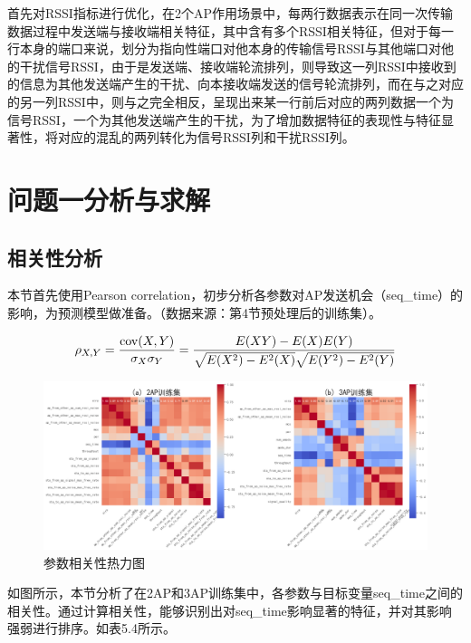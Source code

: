 \documentclass[bwprint]{gmcmthesis}
\begin{document}
首先对RSSI指标进行优化，在2个AP作用场景中，每两行数据表示在同一次传输数据过程中发送端与接收端相关特征，其中含有多个RSSI相关特征，但对于每一行本身的端口来说，划分为指向性端口对他本身的传输信号RSSI与其他端口对他的干扰信号RSSI，由于是发送端、接收端轮流排列，则导致这一列RSSI中接收到的信息为其他发送端产生的干扰、向本接收端发送的信号轮流排列，而在与之对应的另一列RSSI中，则与之完全相反，呈现出来某一行前后对应的两列数据一个为信号RSSI，一个为其他发送端产生的干扰，为了增加数据特征的表现性与特征显著性，将对应的混乱的两列转化为信号RSSI列和干扰RSSI列。


\section{问题一分析与求解}
\subsection{相关性分析}\label{问题一分析}

本节首先使用Pearson correlation，初步分析各参数对AP发送机会（seq\_time）的影响，为预测模型做准备。（数据来源：第4节预处理后的训练集）。


\begin{equation}
	\small
	\rho_{X, Y} = \frac{\operatorname{cov}(X, Y)}{\sigma_{X} \sigma_{Y}} = \frac{E(X Y) - E(X) E(Y)}{\sqrt{E(X^{2}) - E^{2}(X)} \sqrt{E(Y^{2}) - E^{2}(Y)}}
\end{equation}


\begin{figure}[H]
	\centering
	\includegraphics[width=1\linewidth]{figures/问题一热力图}
	\caption{参数相关性热力图}
	\label{fig:}
\end{figure}


如图所示，本节分析了在2AP和3AP训练集中，各参数与目标变量seq\_time之间的相关性。通过计算相关性，能够识别出对seq\_time影响显著的特征，并对其影响强弱进行排序。如表5.4所示。
\end{document}
